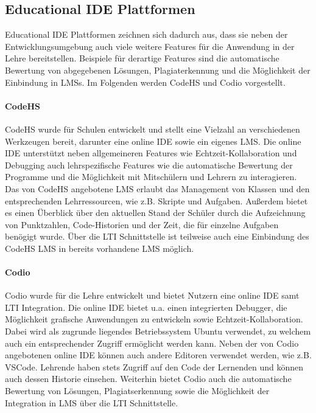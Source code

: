 \subsection{Educational IDE Plattformen}\label{section:stand-der-technik:weitere-entwicklungen:educational-ide-plattformen}

Educational IDE Plattformen zeichnen sich dadurch aus, dass sie neben der Entwicklungsumgebung auch viele weitere Features für die Anwendung in der Lehre bereitstellen. Beispiele für derartige Features sind die automatische Bewertung von abgegebenen Lösungen, Plagiaterkennung und die Möglichkeit der Einbindung in \acp{LMS}. Im Folgenden werden CodeHS \cite{noauthor_codehs_nodate} und Codio \cite{noauthor_codio_nodate} vorgestellt.

\paragraph{CodeHS}
CodeHS \cite{noauthor_codehs_nodate} wurde für Schulen entwickelt und stellt eine Vielzahl an verschiedenen Werkzeugen bereit, darunter eine online IDE sowie ein eigenes \ac{LMS}. Die online IDE unterstützt neben allgemeineren Features wie Echtzeit-Kollaboration und Debugging auch lehrspezifische Features wie die automatische Bewertung der Programme und die Möglichkeit mit Mitschülern und Lehrern zu interagieren. Das von CodeHS angebotene \ac{LMS} erlaubt das Management von Klassen und den entsprechenden Lehrressourcen, wie z.B. Skripte und Aufgaben. Außerdem bietet es einen Überblick über den aktuellen Stand der Schüler durch die Aufzeichnung von Punktzahlen, Code-Historien und der Zeit, die für einzelne Aufgaben benögigt wurde. Über die \ac{LTI} Schnittstelle ist teilweise auch eine Einbindung des CodeHS \ac{LMS} in bereits vorhandene \ac{LMS} möglich.

\paragraph{Codio}
Codio \cite{noauthor_codio_nodate} wurde für die Lehre entwickelt und bietet Nutzern eine online IDE samt \ac{LTI} Integration. Die online IDE bietet u.a. einen integrierten Debugger, die Möglichkeit grafische Anwendungen zu entwickeln sowie Echtzeit-Kollaboration. Dabei wird als zugrunde liegendes Betriebssystem Ubuntu verwendet, zu welchem auch ein entsprechender Zugriff ermöglicht werden kann. Neben der von Codio angebotenen online IDE können auch andere Editoren verwendet werden, wie z.B. \ac{VSCode}. Lehrende haben stets Zugriff auf den Code der Lernenden und können auch dessen Historie einsehen. Weiterhin bietet Codio auch die automatische Bewertung von Lösungen, Plagiatserkennung sowie die Möglichkeit der Integration in \ac{LMS} über die \ac{LTI} Schnittstelle.
